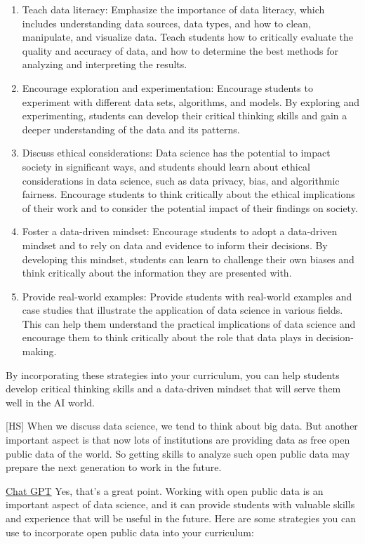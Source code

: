 \documentclass[
]{book}
\providecommand{\tightlist}{%
  \setlength{\itemsep}{0pt}\setlength{\parskip}{0pt}}
\theoremstyle{definition}
\theoremstyle{definition}
\theoremstyle{definition}
\theoremstyle{definition}
\theoremstyle{remark}
\begin{document}
\begin{enumerate}
\def\labelenumi{\arabic{enumi}.}
\tightlist
\item
  Teach data literacy: Emphasize the importance of data literacy, which includes understanding data sources, data types, and how to clean, manipulate, and visualize data. Teach students how to critically evaluate the quality and accuracy of data, and how to determine the best methods for analyzing and interpreting the results.
\item
  Encourage exploration and experimentation: Encourage students to experiment with different data sets, algorithms, and models. By exploring and experimenting, students can develop their critical thinking skills and gain a deeper understanding of the data and its patterns.
\item
  Discuss ethical considerations: Data science has the potential to impact society in significant ways, and students should learn about ethical considerations in data science, such as data privacy, bias, and algorithmic fairness. Encourage students to think critically about the ethical implications of their work and to consider the potential impact of their findings on society.
\item
  Foster a data-driven mindset: Encourage students to adopt a data-driven mindset and to rely on data and evidence to inform their decisions. By developing this mindset, students can learn to challenge their own biases and think critically about the information they are presented with.
\item
  Provide real-world examples: Provide students with real-world examples and case studies that illustrate the application of data science in various fields. This can help them understand the practical implications of data science and encourage them to think critically about the role that data plays in decision-making.
\end{enumerate}

By incorporating these strategies into your curriculum, you can help students develop critical thinking skills and a data-driven mindset that will serve them well in the AI world.

{[}HS{]} When we discuss data science, we tend to think about big data. But another important aspect is that now lots of institutions are providing data as free open public data of the world. So getting skills to analyze such open public data may prepare the next generation to work in the future.

\protect\hyperlink{chatgpt}{Chat GPT} Yes, that's a great point. Working with open public data is an important aspect of data science, and it can provide students with valuable skills and experience that will be useful in the future. Here are some strategies you can use to incorporate open public data into your curriculum:
\end{document}
